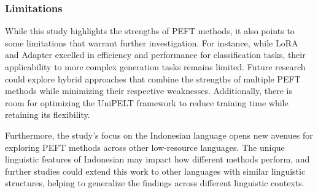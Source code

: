 \subsubsection{\textbf{Limitations}}
While this study highlights the strengths of PEFT methods, it also points to some limitations that warrant further investigation. For instance, while LoRA and Adapter excelled in efficiency and performance for classification tasks, their applicability to more complex generation tasks remains limited. Future research could explore hybrid approaches that combine the strengths of multiple PEFT methods while minimizing their respective weaknesses. Additionally, there is room for optimizing the UniPELT framework to reduce training time while retaining its flexibility.

Furthermore, the study's focus on the Indonesian language opens new avenues for exploring PEFT methods across other low-resource languages. The unique linguistic features of Indonesian may impact how different methods perform, and further studies could extend this work to other languages with similar linguistic structures, helping to generalize the findings across different linguistic contexts.

